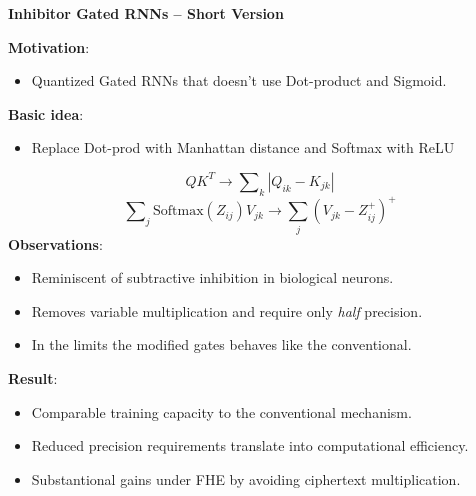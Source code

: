 \documentclass[12pt,oneside]{book}
\begin{document}
\begin{framed}
\begin{center}
    \Huge \textbf{Inhibitor Gated RNNs -- Short Version}
\end{center}    
\Large
\noindent
\textbf{Motivation}: \begin{itemize}
    \item Quantized Gated RNNs that doesn't use Dot-product and Sigmoid.
\end{itemize}

\noindent
\textbf{Basic idea}: 
\begin{itemize}
    \item Replace Dot-prod with Manhattan distance and Softmax with ReLU
\end{itemize}
\begin{equation*}
Q K^T \rightarrow \sum\nolimits_{k} \left|Q_{ik} - K_{jk}\right|
\end{equation*}
\begin{equation*}
\sum\nolimits_{j} \mathrm{Softmax} \left(Z_{ij}\right) V_{jk}  \rightarrow \sum_j \left( V_{jk} - Z_{ij}^+  \right)^+
    \label{eq:inhibition}
\end{equation*}
%
\noindent
\textbf{Observations}:
\begin{itemize}%
    \item Reminiscent of subtractive inhibition in biological neurons.
    \item Removes variable multiplication and require only \textit{half} precision.
    \item In the limits the modified gates behaves like the conventional.
\end{itemize}

\noindent
\textbf{Result}: 

\begin{itemize}
    \item Comparable training capacity to the conventional mechanism.
    \item Reduced precision requirements translate into computational efficiency.
    \item Substantional gains under FHE by avoiding ciphertext multiplication.
\end{itemize}


\end{framed}
\end{document}
